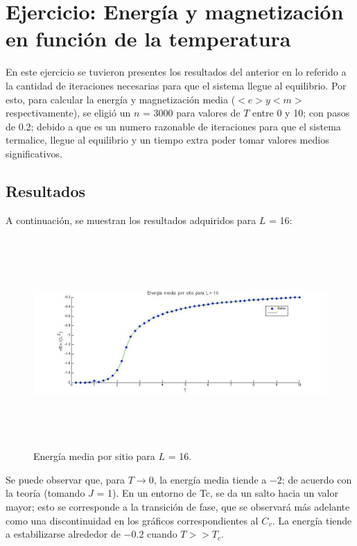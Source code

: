 \documentclass[a4paper,12pt]{article}
\begin{document}
\section{Ejercicio: Energ\'ia y magnetizaci\'on en funci\'on de la temperatura}

En este ejercicio se tuvieron presentes los resultados del anterior en lo referido a la cantidad de iteraciones necesarias para que el sistema llegue al equilibrio. Por esto, para calcular la energ\'ia y magnetizaci\'on media ($<e> y <m>$ respectivamente), se eligi\'o un $n$ = 3000 para valores de $T$ entre 0 y 10; con pasos de 0.2; debido a que es un numero razonable de iteraciones para que el sistema termalice, llegue al equilibrio y un tiempo extra poder tomar valores medios significativos.

\subsection{Resultados}

A continuaci\'on, se muestran los resultados adquiridos para $L$ = 16:

\begin{figure}[H]
\begin{center}
\includegraphics[height=8cm]{../graficos/Emean_L16.jpg}
\caption[width=5cm]{Energ\'ia media por sitio para $L$ = 16.}
\end{center}
\end{figure}

Se puede observar que, para $T \rightarrow 0$, la energ\'ia media tiende a $-2$; de acuerdo con la teor\'ia (tomando $J$ = 1). En un entorno de Tc, se da un salto hacia un valor mayor; esto se corresponde a la transici\'on de fase, que se observar\'a m\'as adelante como una discontinuidad en los gr\'aficos correspondientes al $C_{v}$. La energ\'ia tiende a estabilizarse alrededor de $-0.2$ cuando $T >> T_{c}$.
\end{document}

